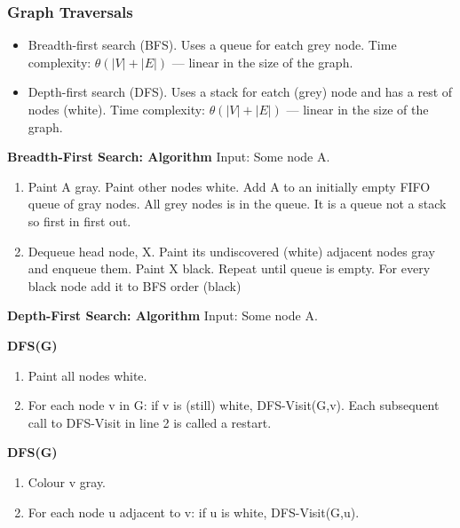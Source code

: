 \subsubsection{Graph Traversals}
\begin{itemize}
\item Breadth-first search (BFS). Uses a queue for eatch grey node. \newline
  Time complexity: $\theta(|V|+|E|)$  — linear in the size of the graph.
\item Depth-first search (DFS). Uses a stack for eatch (grey) node and has a rest of nodes (white). \newline
  Time complexity: $\theta(|V|+|E|)$  — linear in the size of the graph.
\end{itemize}
\vspace{2mm}

\noindent\textbf{Breadth-First Search: Algorithm} \newline
Input: Some node A.
\begin{enumerate}
\item Paint A gray. Paint other nodes white. Add A to an initially empty FIFO queue of gray nodes.
  All grey nodes is in the queue. It is a queue not a stack so first in first out. 
\item Dequeue head node, X. Paint its undiscovered (white) adjacent nodes gray and enqueue them.
  Paint X black. Repeat until queue is empty. For every black node add it to BFS order (black)
\end{enumerate}
\vspace{2mm}

\noindent\textbf{Depth-First Search: Algorithm} \newline
Input: Some node A. \newline

\noindent\textbf{DFS(G)}
\begin{enumerate}
\item Paint all nodes white.
\item For each node v in G: if v is (still) white, DFS-Visit(G,v).
  Each subsequent call to DFS-Visit in line 2 is called a restart.
\end{enumerate}
\vspace{2mm}

\noindent\textbf{DFS(G)}
\begin{enumerate}
\item Colour v gray.
\item For each node u adjacent to v: if u is white, DFS-Visit(G,u).
\end{enumerate}

